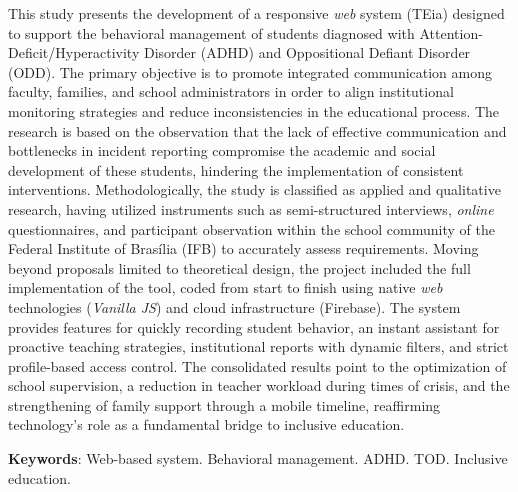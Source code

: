 
\begin{resumo}[ABSTRACT]

    \begin{SingleSpacing}
    
       This study presents the development of a responsive \textit{web} system (TEia) designed to support the behavioral management of students diagnosed with Attention-Deficit/Hyperactivity Disorder (ADHD) and Oppositional Defiant Disorder (ODD). The primary objective is to promote integrated communication among faculty, families, and school administrators in order to align institutional monitoring strategies and reduce inconsistencies in the educational process. The research is based on the observation that the lack of effective communication and bottlenecks in incident reporting compromise the academic and social development of these students, hindering the implementation of consistent interventions. Methodologically, the study is classified as applied and qualitative research, having utilized instruments such as semi-structured interviews, \textit{online} questionnaires, and participant observation within the school community of the Federal Institute of Brasília (IFB) to accurately assess requirements. Moving beyond proposals limited to theoretical design, the project included the full implementation of the tool, coded from start to finish using native \textit{web} technologies (\textit{Vanilla JS}) and cloud infrastructure (Firebase). The system provides features for quickly recording student behavior, an instant assistant for proactive teaching strategies, institutional reports with dynamic filters, and strict profile-based access control. The consolidated results point to the optimization of school supervision, a reduction in teacher workload during times of crisis, and the strengthening of family support through a mobile timeline, reaffirming technology’s role as a fundamental bridge to inclusive education.
        
        \item\textbf{Keywords}: Web-based system. Behavioral management. ADHD. TOD. Inclusive education.
    
    \end{SingleSpacing}
    
\end{resumo}
